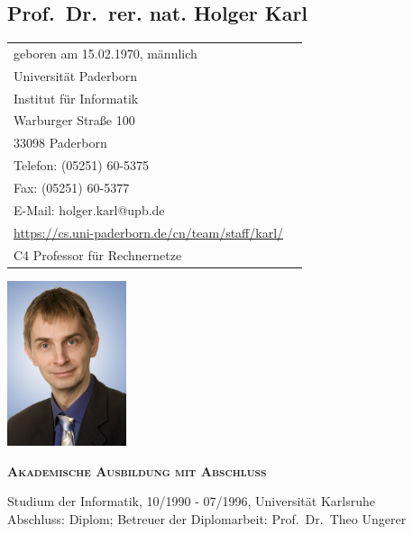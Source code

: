 
\subsection{Prof.\ Dr.\ rer. nat. Holger Karl}
\begin{minipage}{11cm}
\begin{tabular}{@{}l@{\qquad}l}
geboren am 15.02.1970, männlich                          & \\
Universit\"at Paderborn                            & \\
Institut f\"ur Informatik                          & \\
Warburger Straße 100                               & \\
33098 Paderborn                                    & \\
Telefon: (05251) 60-5375                           & \\
Fax: (05251) 60-5377                               & \\
E-Mail: holger.karl@upb.de                                       & \\
\href{https://cs.uni-paderborn.de/cn/team/staff/karl/}{https://cs.uni-paderborn.de/cn/team/staff/karl/}     & \\
C4 Professor für Rechnernetze                              &
\end{tabular}
\end{minipage} \hfill
\begin{minipage}{3.5cm}
\includegraphics[width=3.5cm]{figures/signatures/Karl.jpg}
\end{minipage}


\vspace{0.9em}
\noindent\textsc{\textbf{Akademische Ausbildung mit Abschluss}}

Studium der Informatik, 10/1990 - 07/1996, Universität Karlsruhe \\
Abschluss: Diplom; Betreuer der Diplomarbeit: Prof.~Dr.~Theo Ungerer



